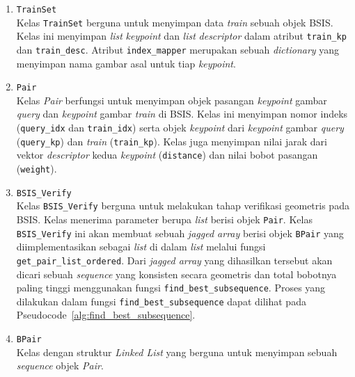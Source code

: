 \begin{enumerate}
	\item \texttt{TrainSet} \\
	Kelas \texttt{TrainSet} berguna untuk menyimpan data \textit{train} sebuah objek BSIS. Kelas ini menyimpan \textit{list} \textit{keypoint} dan \textit{list} \textit{descriptor} dalam atribut \texttt{train\_kp} dan \texttt{train\_desc}. Atribut \texttt{index\_mapper} merupakan sebuah \textit{dictionary} yang menyimpan nama gambar asal untuk tiap \textit{keypoint}.
	\item \texttt{Pair} \\
	Kelas \textit{Pair} berfungsi untuk menyimpan objek pasangan \textit{keypoint} gambar \textit{query} dan \textit{keypoint} gambar \textit{train} di BSIS. Kelas ini menyimpan nomor indeks (\texttt{query\_idx} dan \texttt{train\_idx}) serta objek \textit{keypoint} dari \textit{keypoint} gambar \textit{query} (\texttt{query\_kp}) dan \textit{train} (\texttt{train\_kp}). Kelas juga menyimpan nilai jarak dari vektor \textit{descriptor} kedua \textit{keypoint} (\texttt{distance}) dan nilai bobot pasangan (\texttt{weight}).
	\item \texttt{BSIS\_Verify} \\
	Kelas \texttt{BSIS\_Verify} berguna untuk melakukan tahap verifikasi geometris pada BSIS. Kelas menerima parameter berupa \textit{list} berisi objek \texttt{Pair}. Kelas \texttt{BSIS\_Verify} ini akan membuat sebuah \textit{jagged array} berisi objek \texttt{BPair} yang diimplementasikan sebagai \textit{list} di dalam \textit{list} melalui fungsi \texttt{get\_pair\_list\_ordered}. Dari \textit{jagged array} yang dihasilkan tersebut akan dicari sebuah \textit{sequence} yang konsisten secara geometris dan total bobotnya paling tinggi menggunakan fungsi \texttt{find\_best\_subsequence}. Proses yang dilakukan dalam fungsi \texttt{find\_best\_subsequence} dapat dilihat pada Pseudocode~\ref{alg:find_best_subsequence}.
	\item \texttt{BPair} \\
	Kelas dengan struktur \textit{Linked List} yang berguna untuk menyimpan sebuah \textit{sequence} objek \textit{Pair}.
\end{enumerate}
 
